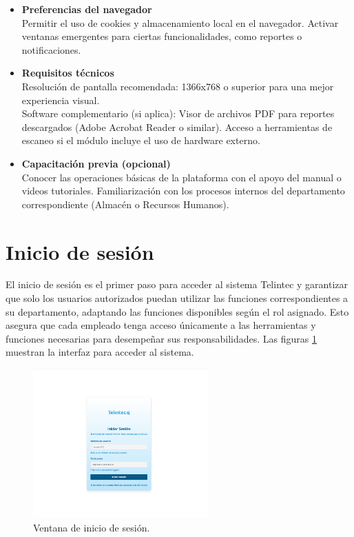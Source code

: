 \begin{itemize}
  \item \textbf{Preferencias del navegador}\\
  Permitir el uso de cookies y almacenamiento local en el navegador. Activar ventanas emergentes para ciertas funcionalidades, como reportes o notificaciones.

  \item \textbf{Requisitos técnicos}\\
  Resolución de pantalla recomendada: 1366x768 o superior para una mejor experiencia visual.\\
  Software complementario (si aplica): Visor de archivos PDF para reportes descargados (Adobe Acrobat Reader o similar). Acceso a herramientas de escaneo si el módulo incluye el uso de hardware externo.

  \item \textbf{Capacitación previa (opcional)}\\
  Conocer las operaciones básicas de la plataforma con el apoyo del manual o videos tutoriales. Familiarización con los procesos internos del departamento correspondiente (Almacén o Recursos Humanos).
\end{itemize}


\section{Inicio de sesión}
\begin{justify}
El inicio de sesión es el primer paso para acceder al sistema Telintec y garantizar que solo los usuarios autorizados puedan utilizar las funciones correspondientes a su departamento, adaptando las funciones disponibles según el rol asignado. Esto asegura que cada empleado tenga acceso únicamente a las herramientas y funciones necesarias para desempeñar sus responsabilidades. Las figuras \ref{fig:session} muestran la interfaz para acceder al sistema. 
\end{justify}


\begin{figure}[ht!]
\centering
\includegraphics[width=0.6\textwidth]{imgs/inicio_de_sesion/inicio_sesion_desktop.png}
\caption{Ventana de inicio de sesión.}
\label{fig:session}
\end{figure}

